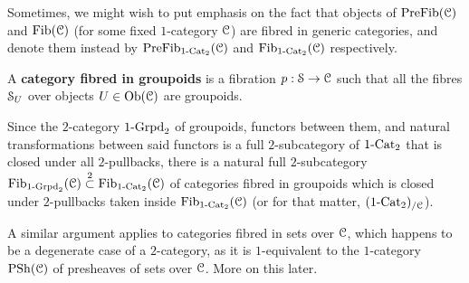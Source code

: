             \begin{convention}
                Sometimes, we might wish to put emphasis on the fact that objects of $\Pre\Fib(\C)$ and $\Fib(\C)$ (for some fixed $1$-category $\C$) are fibred in generic categories, and denote them instead by $\Pre\Fib_{1\-\Cat_2}(\C)$ and $\Fib_{1\-\Cat_2}(\C)$ respectively.
            \end{convention}
            \begin{definition} \label{def: categories_fibred_in_groupoids}
                A \textbf{category fibred in groupoids} is a fibration $p: \S \to \C$ such that all the fibres $\S_U$ over objects $U \in \Ob(\C)$ are groupoids. 
            \end{definition}
            \begin{remark}
                Since the $2$-category $1\-\Grpd_2$ of groupoids, functors between them, and natural transformations between said functors is a full $2$-subcategory of $1\-\Cat_2$ that is closed under all $2$-pullbacks, there is a natural full $2$-subcategory $\Fib_{1\-\Grpd_2}(\C) \overset{2}{\subset} \Fib_{1\-\Cat_2}(\C)$ of categories fibred in groupoids which is closed under $2$-pullbacks taken inside $\Fib_{1\-\Cat_2}(\C)$ (or for that matter, $(1\-\Cat_2)_{/\C}$).
                
                A similar argument applies to categories fibred in sets over $\C$, which happens to be a degenerate case of a $2$-category, as it is $1$-equivalent to the $1$-category $\Psh(\C)$ of presheaves of sets over $\C$. More on this later. 
            \end{remark}
            
